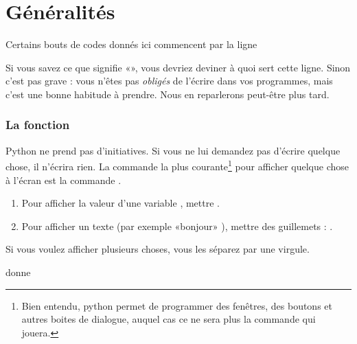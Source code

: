 
\chapter{Généralités}

\begin{remark}
    Certains bouts de codes donnés ici commencent par la ligne
    \begin{quote}
    \end{quote}
    Si vous savez ce que signifie «», vous devriez deviner à quoi sert cette ligne. Sinon c'est pas grave : vous n'êtes pas \emph{obligés} de l'écrire dans vos programmes, mais c'est une bonne habitude à prendre. Nous en reparlerons peut-être plus tard.
\end{remark}

\subsection{La fonction }

Python ne prend pas d'initiatives. Si vous ne lui demandez pas d'écrire quelque chose, il n'écrira rien. La commande la plus courante\footnote{Bien entendu, python permet de programmer des fenêtres, des boutons et autres boites de dialogue, auquel cas ce ne sera plus la commande  qui jouera.} pour afficher quelque chose à l'écran est la commande . 
\begin{enumerate}
    \item
        Pour afficher la valeur d'une variable , mettre .
    \item
        Pour afficher un texte (par exemple «bonjour» ), mettre des guillemets : .
\end{enumerate}
Si vous voulez afficher plusieurs choses, vous les séparez par une virgule.



donne



